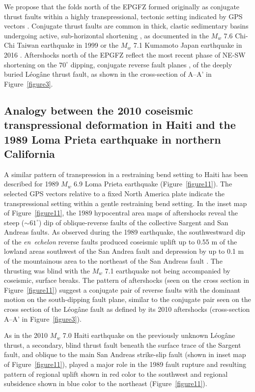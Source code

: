 \documentclass[linenumbers,draft]{agujournal}
\begin{document}
We propose that the folds north of the EPGFZ formed originally as conjugate thrust faults within a highly transpressional, tectonic setting indicated by GPS vectors \citep{calais2010transpressional}. Conjugate thrust faults are common in thick, clastic sedimentary basins undergoing active, sub-horizontal shortening \citep{sibson2012reverse}, as documented in the $M_w$ 7.6 Chi-Chi Taiwan earthquake in 1999 \citep{chen2002conjugate} or the $M_w$ 7.1 Kumamoto Japan earthquake in 2016 \citep{lin2017coseismic}. Aftershocks north of the EPGFZ reflect the most recent phase of NE-SW shortening on the $70^{\circ}$ dipping, conjugate reverse fault planes \citep{nettles2010earthquake}, of the deeply buried L\'eog\^ane thrust fault, as shown in the cross-section of A--A' in Figure~\ref{figure3}.

\subsection{Analogy between the 2010 coseismic transpressional deformation in Haiti and the 1989 Loma Prieta earthquake in northern California}

A similar pattern of transpression in a restraining bend setting to Haiti has been described for 1989 $M_w$ 6.9 Loma Prieta earthquake \citep{marshall1991faulting} (Figure~\ref{figure11}). The selected GPS vectors relative to a fixed North America plate \citep{UNAVCO2009} indicate the transpressional setting within a gentle restraining bend setting. In the inset map of Figure~\ref{figure11}, the 1989 hypocentral area maps of aftershocks \citep{marshall1991faulting} reveal the steep ($\sim61^{\circ}$) dip of oblique-reverse faults of the collective Sargent and San Andreas faults. As observed during the 1989 earthquake, the southwestward dip of the \textit{en~echelon} reverse faults produced coseismic uplift up to 0.55 m of the lowland areas southwest of the San Andrea fault and depression by up to 0.1 m of the mountainous area to the northeast of the San Andreas fault \citep{marshall1991faulting}. The thrusting was blind with the $M_w$ 7.1 earthquake not being accompanied by coseismic, surface breaks. The pattern of aftershocks (seen on the cross section in Figure~\ref{figure11}) suggest a conjugate pair of reverse faults with the dominant motion on the south-dipping fault plane, similar to the conjugate pair seen on the cross section of the L\'eog\^ane fault as defined by its 2010 aftershocks (cross-section A--A' in Figure~\ref{figure3}). 

As in the 2010 $M_w$ 7.0 Haiti earthquake on the previously unknown L\'eog\^ane thrust, a secondary, blind thrust fault \citep{olson1990seismicity} beneath the surface trace of the Sargent fault, and oblique to the main San Andreas strike-slip fault (shown in inset map of Figure~\ref{figure11}), played a major role in the 1989 fault rupture and resulting pattern of regional uplift shown in red color to the southwest and regional subsidence shown in blue color to the northeast (Figure~\ref{figure11}).
\end{document}
